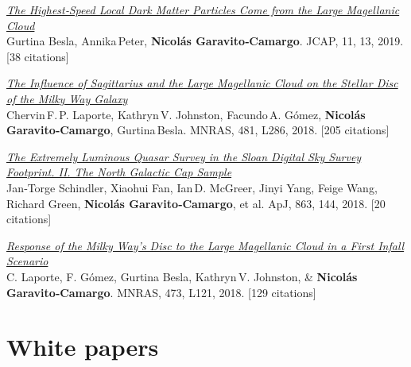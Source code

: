 \documentclass[14pt]{article}
\begin{document}
\begin{etaremune}
\item \textit{\href{https://ui.adsabs.harvard.edu/abs/2019JCAP...11...13B/abstract}{The Highest‑Speed Local Dark Matter Particles Come from the Large Magellanic Cloud}}\\
{\small \color{darkgray} Gurtina Besla, Annika Peter, \textbf{Nicol\'as Garavito‑Camargo}. JCAP, 11, 13, 2019. [38 citations]}

\item \textit{\href{https://ui.adsabs.harvard.edu/abs/2018MNRAS.481L..286L/abstract}{The Influence of Sagittarius and the Large Magellanic Cloud on the Stellar Disc of the Milky Way Galaxy}}\\
{\small \color{darkgray} Chervin F. P. Laporte, Kathryn V. Johnston, Facundo A. Gómez, \textbf{Nicol\'as Garavito‑Camargo}, Gurtina Besla. MNRAS, 481, L286, 2018. [205 citations]}

\item \textit{\href{https://ui.adsabs.harvard.edu/abs/2018ApJ...863..144S/abstract}{The Extremely Luminous Quasar Survey in the Sloan Digital Sky Survey Footprint. II. The North Galactic Cap Sample}}\\
{\small \color{darkgray} Jan‑Torge Schindler, Xiaohui Fan, Ian D. McGreer, Jinyi Yang, Feige Wang, Richard Green, \textbf{Nicol\'as Garavito‑Camargo}, et al. ApJ, 863, 144, 2018. [20 citations]}

\item \textit{\href{https://ui.adsabs.harvard.edu/abs/2018MNRAS.473L.121L/abstract}{Response of the Milky Way’s Disc to the Large Magellanic Cloud in a First Infall Scenario}}\\
{\small \color{darkgray} C. Laporte, F. Gómez, Gurtina Besla, Kathryn V. Johnston, \& \textbf{Nicol\'as Garavito‑Camargo}. MNRAS, 473, L121, 2018. [129 citations]}

\end{etaremune}




\section*{White papers}
\end{document}
